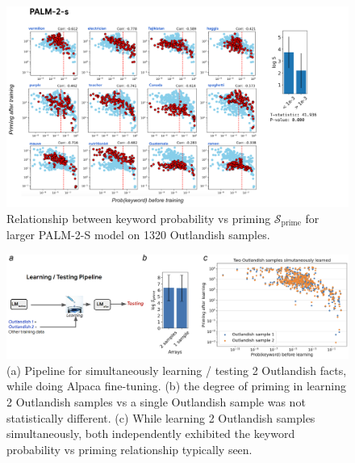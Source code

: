 \documentclass[11pt, a4paper, logo, copyright]{googledeepmind}
\theoremstyle{plain}
\theoremstyle{definition}
\theoremstyle{remark}
\begin{document}
\begin{figure}[h]
\vspace{0mm}
    \centering \includegraphics[scale=.35,clip]{figures/PALM24b.pdf}
    \vspace{-1mm}
    \caption{Relationship between keyword probability vs priming $\mathcal{S}_\text{prime}$ for larger PALM-2-S model on 1320 Outlandish samples.} \label{fig:palm24b}
  \vspace{-0mm}
\end{figure}



\begin{figure}[h]
\vspace{0mm}
    \centering \includegraphics[scale=.32,clip]{figures/Interaction.png}
    \vspace{-1mm}
    \caption{(a) Pipeline for simultaneously learning / testing 2 Outlandish facts, while doing Alpaca fine-tuning. (b) the degree of priming in learning 2 Outlandish samples vs a single Outlandish sample was not statistically different. (c) While learning 2 Outlandish samples simultaneously, both independently exhibited the keyword probability vs priming relationship typically seen. } \label{fig:Interaction}
  \vspace{-0mm}
\end{figure}
\end{document}
